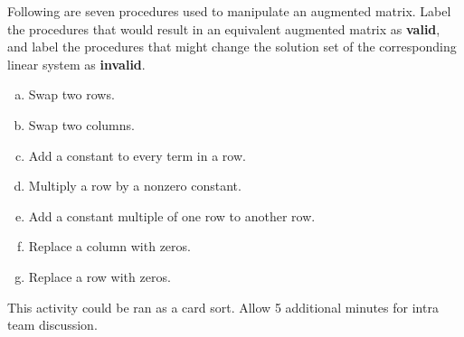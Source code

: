 \begin{activity}{10}
  Following are seven procedures used to manipulate an augmented matrix.
  Label the procedures that would result in an equivalent augmented
  matrix as \textbf{valid}, and label the procedures that might
  change the solution set of the corresponding linear system as
  \textbf{invalid}.
  \begin{multicols}{2}
    \begin{enumerate}[a)]
      \item Swap two rows.
      \item Swap two columns.
      \item Add a constant to every term in a row.
      \item Multiply a row by a nonzero constant. \columnbreak
      \item Add a constant multiple of one row to another row.
      \item Replace a column with zeros.
      \item Replace a row with zeros.
    \end{enumerate}
  \end{multicols}
  \begin{instructorNote}
    This activity could be ran as a card sort.  Allow 5 additional minutes for intra team discussion.
  \end{instructorNote}
\end{activity}



